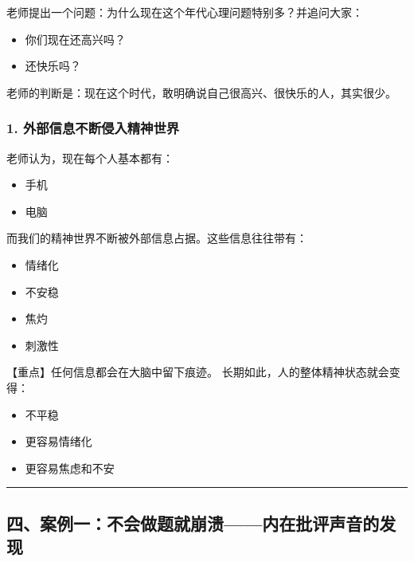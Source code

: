 \documentclass[
  chinese,
  9pt,
  a4paper,
]{ctexart}
\providecommand{\tightlist}{%
  \setlength{\itemsep}{0pt}\setlength{\parskip}{0pt}}
\begin{document}
老师提出一个问题：为什么现在这个年代心理问题特别多？并追问大家：

\begin{itemize}
\tightlist
\item
  你们现在还高兴吗？
\item
  还快乐吗？
\end{itemize}

老师的判断是：现在这个时代，敢明确说自己很高兴、很快乐的人，其实很少。

\subsubsection{1.
外部信息不断侵入精神世界}\label{ux5916ux90e8ux4fe1ux606fux4e0dux65adux4fb5ux5165ux7cbeux795eux4e16ux754c}

老师认为，现在每个人基本都有：

\begin{itemize}
\tightlist
\item
  手机
\item
  电脑
\end{itemize}

而我们的精神世界不断被外部信息占据。这些信息往往带有：

\begin{itemize}
\tightlist
\item
  情绪化
\item
  不安稳
\item
  焦灼
\item
  刺激性
\end{itemize}

【重点】任何信息都会在大脑中留下痕迹。
长期如此，人的整体精神状态就会变得：

\begin{itemize}
\tightlist
\item
  不平稳
\item
  更容易情绪化
\item
  更容易焦虑和不安
\end{itemize}

\begin{center}\rule{0.5\linewidth}{0.5pt}\end{center}

\subsection{四、案例一：不会做题就崩溃------内在批评声音的发现}\label{ux56dbux6848ux4f8bux4e00ux4e0dux4f1aux505aux9898ux5c31ux5d29ux6e83ux5185ux5728ux6279ux8bc4ux58f0ux97f3ux7684ux53d1ux73b0}
\end{document}
